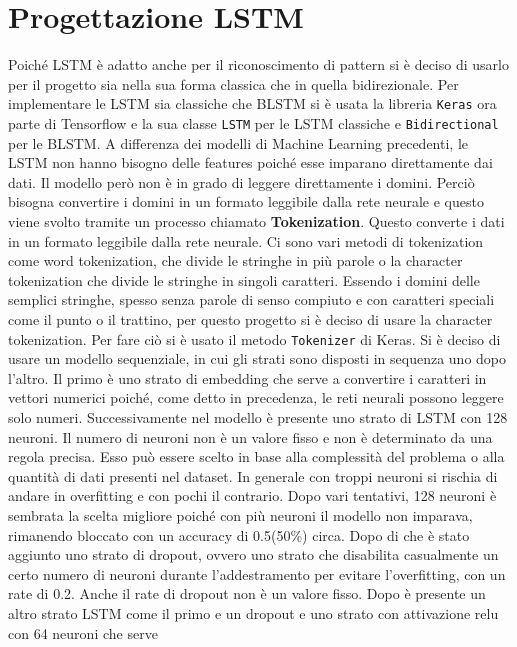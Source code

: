 \documentclass[12pt,a4paper,openright,twoside]{book}
\begin{document}
\section{Progettazione LSTM}
Poiché LSTM è adatto anche per il riconoscimento di pattern
si è deciso di usarlo per il progetto sia nella sua forma classica che in quella bidirezionale.
Per implementare le LSTM sia classiche che BLSTM si è usata la libreria \texttt{Keras} \cite{Keras}
ora parte di Tensorflow
e la sua classe \texttt{LSTM} per le LSTM classiche e \texttt{Bidirectional} per le BLSTM.
A differenza dei modelli di Machine Learning precedenti,
le LSTM non hanno bisogno delle features poiché esse imparano direttamente dai dati.
Il modello però non è in grado di leggere direttamente i domini.
Perciò bisogna convertire i domini in un formato leggibile dalla rete neurale e questo viene
svolto tramite un processo chiamato \textbf{Tokenization}.
Questo converte i dati in un formato leggibile dalla rete neurale.
Ci sono vari metodi di tokenization come word tokenization, che divide 
le stringhe in più parole o la character tokenization
che divide le stringhe in singoli caratteri. Essendo i domini delle semplici stringhe,
spesso senza parole di senso compiuto e con caratteri speciali come il punto o il trattino,
per questo progetto si è deciso di usare la character tokenization.
Per fare ciò si è usato il metodo \texttt{Tokenizer} di Keras.
Si è deciso di usare
un modello sequenziale, in cui gli
strati sono disposti in sequenza uno dopo l'altro. \hfil \break
Il primo è uno strato di embedding che serve 
a convertire i caratteri in vettori numerici poiché,
come detto in precedenza, le reti neurali
possono leggere solo numeri. \hfil \break
Successivamente nel modello è presente uno strato di LSTM
con 128 neuroni. Il numero di neuroni non 
è un valore fisso e non è determinato da una regola precisa.
Esso può essere scelto in base
alla complessità del problema o alla quantità di dati
presenti nel dataset. In generale con troppi neuroni si rischia di
andare in overfitting e con pochi il contrario. Dopo
vari tentativi, 128 neuroni è sembrata la scelta migliore poiché
con più neuroni il modello non imparava, rimanendo bloccato con un accuracy di 0.5(50\%) circa. \hfil \break
Dopo di che è stato aggiunto uno strato di dropout,
ovvero uno strato che disabilita casualmente
un certo numero di neuroni durante l'addestramento 
per evitare l'overfitting, con un rate di 0.2. Anche il rate di dropout non
è un valore fisso.
Dopo è presente un altro strato LSTM come il primo e un dropout
e uno strato con attivazione relu con 64 neuroni che serve
\end{document}
